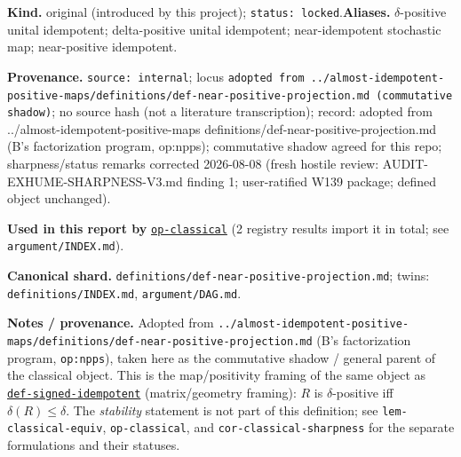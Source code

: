 \begin{defnote}
\textbf{Kind.} original (introduced by this project); \texttt{status: locked}.\quad\textbf{Aliases.} $\delta$-positive unital idempotent; delta-positive unital idempotent; near-idempotent stochastic map; near-positive idempotent.
\par
\textbf{Provenance.} \texttt{source: internal}; locus \texttt{adopted from ..\allowbreak{}/\allowbreak{}almost-\allowbreak{}idempotent-\allowbreak{}positive-\allowbreak{}maps/\allowbreak{}definitions/\allowbreak{}def-\allowbreak{}near-\allowbreak{}positive-\allowbreak{}projection.\allowbreak{}md (commutative shadow)}; no source hash (not a literature transcription); record: adopted from ..\allowbreak{}/\allowbreak{}almost-\allowbreak{}idempotent-\allowbreak{}positive-\allowbreak{}maps definitions/\allowbreak{}def-\allowbreak{}near-\allowbreak{}positive-\allowbreak{}projection.\allowbreak{}md (B's factorization program,\allowbreak{} op:\allowbreak{}npps);\allowbreak{} commutative shadow agreed for this repo;\allowbreak{} sharpness/\allowbreak{}status remarks corrected 2026-\allowbreak{}08-\allowbreak{}08 (fresh hostile review:\allowbreak{} AUDIT-\allowbreak{}EXHUME-\allowbreak{}SHARPNESS-\allowbreak{}V3.\allowbreak{}md finding 1;\allowbreak{} user-\allowbreak{}ratified W139 package;\allowbreak{} defined object unchanged).
\par
\textbf{Used in this report by} \hyperref[op:classical]{\texttt{op-\allowbreak{}classical}} (2 registry results import it in total; see \texttt{argument/INDEX.md}).
\par
\textbf{Canonical shard.} \texttt{definitions/\allowbreak{}def-\allowbreak{}near-\allowbreak{}positive-\allowbreak{}projection.\allowbreak{}md}; twins: \texttt{definitions/INDEX.md}, \texttt{argument/DAG.md}.
\par
\textbf{Notes / provenance.} Adopted from \texttt{..\allowbreak{}/\allowbreak{}almost-\allowbreak{}idempotent-\allowbreak{}positive-\allowbreak{}maps/\allowbreak{}definitions/\allowbreak{}def-\allowbreak{}near-\allowbreak{}positive-\allowbreak{}projection.\allowbreak{}md}
(B's factorization program, \texttt{op:\allowbreak{}npps}), taken here as the commutative shadow / general parent of the
classical object. This is the map/positivity framing of the same object as \hyperref[def:signed-idempotent]{\texttt{def-\allowbreak{}signed-\allowbreak{}idempotent}}
(matrix/geometry framing): $R$ is $\delta$-positive iff $\delta(R)\le\delta$. The \emph{stability} statement is not part of this definition; see \texttt{lem-\allowbreak{}classical-\allowbreak{}equiv},
\texttt{op-\allowbreak{}classical}, and \texttt{cor-\allowbreak{}classical-\allowbreak{}sharpness} for the separate formulations and their statuses.
\end{defnote}

